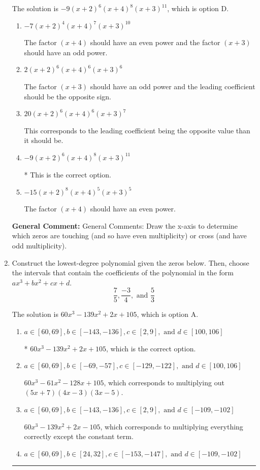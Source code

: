 \documentclass{extbook}[14pt]
\newcommand{\litem}[1]{\item #1

\rule{\textwidth}{0.4pt}}
\begin{document}
\begin{enumerate}
{The solution is \( -9(x + 2)^{6} (x + 4)^{8} (x + 3)^{11} \), which is option D.\begin{enumerate}[label=\Alph*.]
\item \( -7(x + 2)^{4} (x + 4)^{7} (x + 3)^{10} \)

The factor $(x + 4)$ should have an even power and the factor $(x + 3)$ should have an odd power.
\item \( 2(x + 2)^{6} (x + 4)^{6} (x + 3)^{6} \)

The factor $(x + 3)$ should have an odd power and the leading coefficient should be the opposite sign.
\item \( 20(x + 2)^{6} (x + 4)^{6} (x + 3)^{7} \)

This corresponds to the leading coefficient being the opposite value than it should be.
\item \( -9(x + 2)^{6} (x + 4)^{8} (x + 3)^{11} \)

* This is the correct option.
\item \( -15(x + 2)^{8} (x + 4)^{5} (x + 3)^{5} \)

The factor $(x + 4)$ should have an even power.
\end{enumerate}

\textbf{General Comment:} General Comments: Draw the x-axis to determine which zeros are touching (and so have even multiplicity) or cross (and have odd multiplicity).
}
\litem{
Construct the lowest-degree polynomial given the zeros below. Then, choose the intervals that contain the coefficients of the polynomial in the form $ax^3+bx^2+cx+d$.
\[ \frac{7}{5}, \frac{-3}{4}, \text{ and } \frac{5}{3} \]

The solution is \( 60x^{3} -139 x^{2} +2 x + 105 \), which is option A.\begin{enumerate}[label=\Alph*.]
\item \( a \in [60, 69], b \in [-143, -136], c \in [2, 9], \text{ and } d \in [100, 106] \)

* $60x^{3} -139 x^{2} +2 x + 105$, which is the correct option.
\item \( a \in [60, 69], b \in [-69, -57], c \in [-129, -122], \text{ and } d \in [100, 106] \)

$60x^{3} -61 x^{2} -128 x + 105$, which corresponds to multiplying out $(5x + 7)(4x -3)(3x -5)$.
\item \( a \in [60, 69], b \in [-143, -136], c \in [2, 9], \text{ and } d \in [-109, -102] \)

$60x^{3} -139 x^{2} +2 x -105$, which corresponds to multiplying everything correctly except the constant term.
\item \( a \in [60, 69], b \in [24, 32], c \in [-153, -147], \text{ and } d \in [-109, -102] \)


\end{enumerate}}
\end{enumerate}
\end{document}
